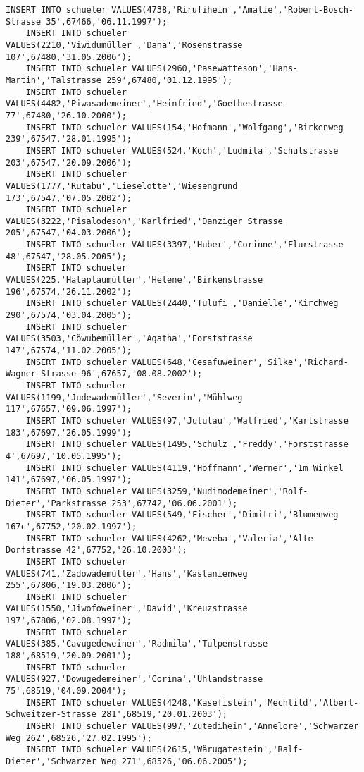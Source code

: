 \begin{lstlisting}[breaklines=True, numbers=none, basicstyle=\tiny, keepspaces=false]
	INSERT INTO schueler VALUES(4738,'Rirufihein','Amalie','Robert-Bosch-Strasse 35',67466,'06.11.1997');
	INSERT INTO schueler VALUES(2210,'Viwidumüller','Dana','Rosenstrasse 107',67480,'31.05.2006');
	INSERT INTO schueler VALUES(2960,'Pasewatteson','Hans-Martin','Talstrasse 259',67480,'01.12.1995');
	INSERT INTO schueler VALUES(4482,'Piwasademeiner','Heinfried','Goethestrasse 77',67480,'26.10.2000');
	INSERT INTO schueler VALUES(154,'Hofmann','Wolfgang','Birkenweg 239',67547,'28.01.1995');
	INSERT INTO schueler VALUES(524,'Koch','Ludmila','Schulstrasse 203',67547,'20.09.2006');
	INSERT INTO schueler VALUES(1777,'Rutabu','Lieselotte','Wiesengrund 173',67547,'07.05.2002');
	INSERT INTO schueler VALUES(3222,'Pisalodeson','Karlfried','Danziger Strasse 205',67547,'04.03.2006');
	INSERT INTO schueler VALUES(3397,'Huber','Corinne','Flurstrasse 48',67547,'28.05.2005');
	INSERT INTO schueler VALUES(225,'Hataplaumüller','Helene','Birkenstrasse 196',67574,'26.11.2002');
	INSERT INTO schueler VALUES(2440,'Tulufi','Danielle','Kirchweg 290',67574,'03.04.2005');
	INSERT INTO schueler VALUES(3503,'Cöwubemüller','Agatha','Forststrasse 147',67574,'11.02.2005');
	INSERT INTO schueler VALUES(648,'Cesafuweiner','Silke','Richard-Wagner-Strasse 96',67657,'08.08.2002');
	INSERT INTO schueler VALUES(1199,'Judewademüller','Severin','Mühlweg 117',67657,'09.06.1997');
	INSERT INTO schueler VALUES(97,'Jutulau','Walfried','Karlstrasse 183',67697,'26.05.1999');
	INSERT INTO schueler VALUES(1495,'Schulz','Freddy','Forststrasse 4',67697,'10.05.1995');
	INSERT INTO schueler VALUES(4119,'Hoffmann','Werner','Im Winkel 141',67697,'06.05.1997');
	INSERT INTO schueler VALUES(3259,'Nudimodemeiner','Rolf-Dieter','Parkstrasse 253',67742,'06.06.2001');
	INSERT INTO schueler VALUES(549,'Fischer','Dimitri','Blumenweg 167c',67752,'20.02.1997');
	INSERT INTO schueler VALUES(4262,'Meveba','Valeria','Alte Dorfstrasse 42',67752,'26.10.2003');
	INSERT INTO schueler VALUES(741,'Zadowademüller','Hans','Kastanienweg 255',67806,'19.03.2006');
	INSERT INTO schueler VALUES(1550,'Jiwofoweiner','David','Kreuzstrasse 197',67806,'02.08.1997');
	INSERT INTO schueler VALUES(385,'Cavugedeweiner','Radmila','Tulpenstrasse 188',68519,'20.09.2001');
	INSERT INTO schueler VALUES(927,'Dowugedemeiner','Corina','Uhlandstrasse 75',68519,'04.09.2004');
	INSERT INTO schueler VALUES(4248,'Kasefistein','Mechtild','Albert-Schweitzer-Strasse 281',68519,'20.01.2003');
	INSERT INTO schueler VALUES(997,'Zutedihein','Annelore','Schwarzer Weg 262',68526,'27.02.1995');
	INSERT INTO schueler VALUES(2615,'Wärugatestein','Ralf-Dieter','Schwarzer Weg 271',68526,'06.06.2005');

\end{lstlisting}
